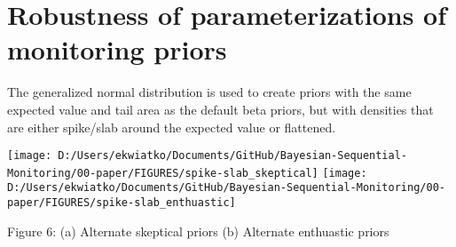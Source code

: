 \documentclass[12pt]{article}
\begin{document}
\newpage
\section{Robustness of parameterizations of monitoring priors}
The generalized normal distribution is used to create priors with the same expected value and tail area as the default beta priors, but with densities that are either spike/slab around the expected value or flattened.
\begin{center}
\texttt{[image: D:/Users/ekwiatko/Documents/GitHub/Bayesian-Sequential-Monitoring/00-paper/FIGURES/spike-slab\_skeptical]}
\texttt{[image: D:/Users/ekwiatko/Documents/GitHub/Bayesian-Sequential-Monitoring/00-paper/FIGURES/spike-slab\_enthuastic]}

Figure 6: (a) Alternate skeptical priors (b) Alternate enthuastic priors
\end{center}
\newpage
\end{document}
